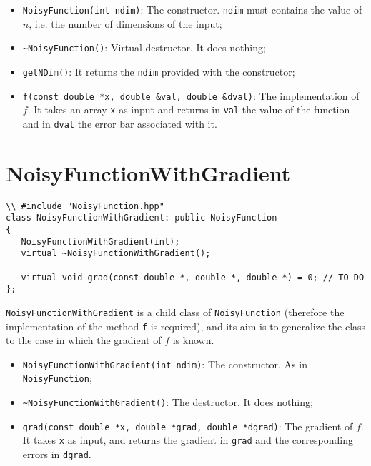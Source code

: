 \documentclass[11pt,a4paper,twoside]{article}
\begin{document}
\begin{itemize}
   \item \verb+NoisyFunction(int ndim)+: The constructor. \verb+ndim+ must contains the value of $n$, i.e. the number of dimensions of the input;
   \item \verb+~NoisyFunction()+: Virtual destructor. It does nothing;
   \item \verb+getNDim()+: It returns the \verb+ndim+ provided with the constructor;
   \item \verb+f(const double *x, double &val, double &dval)+: The implementation of $f$. It takes an array \verb+x+ as input and returns in \verb+val+ the value of the function and in \verb+dval+ the error bar associated with it.
\end{itemize}




\section{NoisyFunctionWithGradient} %
\label{sec:NoisyFunctionWithGradient}

\begin{verbatim}
\\ #include "NoisyFunction.hpp"
class NoisyFunctionWithGradient: public NoisyFunction
{
   NoisyFunctionWithGradient(int);
   virtual ~NoisyFunctionWithGradient();
   
   virtual void grad(const double *, double *, double *) = 0; // TO DO
};
\end{verbatim}

\verb+NoisyFunctionWithGradient+ is a child class of \verb+NoisyFunction+ (therefore the implementation of the method \verb+f+ is required), and its aim is to generalize the class to the case in which the gradient of $f$ is known.

\begin{itemize}
   \item \verb+NoisyFunctionWithGradient(int ndim)+: The constructor. As in \verb+NoisyFunction+;
   \item \verb+~NoisyFunctionWithGradient()+: The destructor. It does nothing;
   \item \verb+grad(const double *x, double *grad, double *dgrad)+: The gradient of $f$. It takes \verb+x+ as input, and returns the gradient in \verb+grad+ and the corresponding errors in \verb+dgrad+.
\end{itemize}
\end{document}
